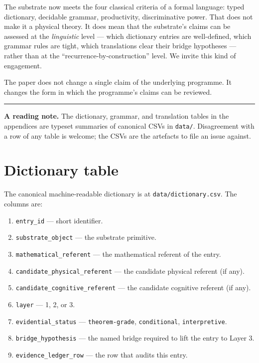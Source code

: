 \documentclass[11pt,a4paper]{article}
\begin{document}
The substrate now meets the four classical criteria of a formal
language: typed dictionary, decidable grammar, productivity,
discriminative power. That does not make it a physical theory. It
does mean that the substrate's claims can be assessed at the
\emph{linguistic} level --- which dictionary entries are
well-defined, which grammar rules are tight, which translations
clear their bridge hypotheses --- rather than at the
``recurrence-by-construction'' level. We invite this kind of
engagement.

The paper does not change a single claim of the underlying
programme. It changes the form in which the programme's claims can
be reviewed.

\bigskip
\hrule
\bigskip

\noindent
\textbf{A reading note.}
The dictionary, grammar, and translation tables in the appendices
are typeset summaries of canonical CSVs in \texttt{data/}.
Disagreement with a row of any table is welcome; the CSVs are the
artefacts to file an issue against.

\appendix

\section{Dictionary table}
\label{app:dictionary}

The canonical machine-readable dictionary is at
\texttt{data/dictionary.csv}. The columns are:

\begin{enumerate}[leftmargin=*]
  \item \texttt{entry\_id} --- short identifier.
  \item \texttt{substrate\_object} --- the substrate primitive.
  \item \texttt{mathematical\_referent} --- the mathematical
        referent of the entry.
  \item \texttt{candidate\_physical\_referent} --- the candidate
        physical referent (if any).
  \item \texttt{candidate\_cognitive\_referent} --- the candidate
        cognitive referent (if any).
  \item \texttt{layer} --- 1, 2, or 3.
  \item \texttt{evidential\_status} --- \texttt{theorem-grade},
        \texttt{conditional}, \texttt{interpretive}.
  \item \texttt{bridge\_hypothesis} --- the named bridge required
        to lift the entry to Layer 3.
  \item \texttt{evidence\_ledger\_row} --- the
        \cite{evidenceLedger} row that audits this entry.
\end{enumerate}
\end{document}
